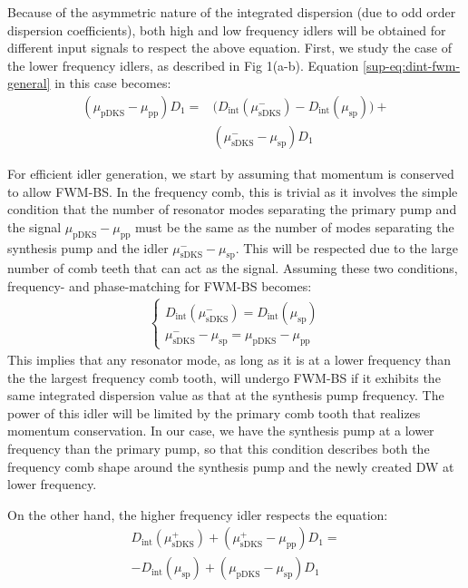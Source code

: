 \documentclass[reprint,superscriptaddress, amsmath,amssymb,pra, aps,floatfix,longbibliography]{revtex4-1}
\begin{document}
Because of the asymmetric nature of the integrated dispersion (due to odd order dispersion coefficients), both high and low frequency idlers will be obtained for different input signals to respect the above equation. First, we study the case of the lower frequency idlers, as described in Fig 1(a-b). Equation \ref{sup-eq:dint-fwm-general} in this case becomes:
\begin{align}
    \label{sup-eq:dint-fwm-minus}
    \left(\mu_\mathrm{pDKS} - \mu_\mathrm{pp} \right )D_1 = & \Big(D_\mathrm{int}(\mu_\mathrm{sDKS}^{-}) - D_\mathrm{int}(\mu_\mathrm{sp}) \Big) + \nonumber \\ &\left( \mu_\mathrm{sDKS}^{-} - \mu_\mathrm{sp} \right )D_1
\end{align}

For efficient idler generation, we start by assuming that momentum is conserved to allow FWM-BS. In the frequency comb, this is trivial as it involves the simple condition that the number of resonator modes separating the primary pump and the signal $\mu_\mathrm{pDKS} - \mu_\mathrm{pp}$ must be the same as the number of modes separating the synthesis pump and the idler $\mu_\mathrm{sDKS}^{-} - \mu_\mathrm{sp}$. This will be respected due to the large number of comb teeth that can act as the signal. Assuming these two conditions, frequency- and phase-matching for FWM-BS becomes:
\begin{align}
    \label{sup-eq:dint-minus-condition}
    \begin{cases}
        D_\mathrm{int}(\mu_\mathrm{sDKS}^{-}) =  D_\mathrm{int}(\mu_\mathrm{sp}) \\
        \mu_\mathrm{sDKS}^{-} - \mu_\mathrm{sp} = \mu_\mathrm{pDKS} - \mu_\mathrm{pp}
    \end{cases}
\end{align}
This implies that any resonator mode, as long as it is at a lower frequency than the the largest frequency comb tooth, will undergo FWM-BS if it exhibits the same integrated dispersion value as that at the synthesis pump frequency. The power of this idler will be limited by the primary comb tooth that realizes momentum conservation. In our case, we have the synthesis pump at a lower frequency than the primary pump, so that this condition describes both the frequency comb shape around the synthesis pump and the newly created DW at lower frequency.


On the other hand, the higher frequency idler respects the equation:
\begin{align}
    \label{sup-eq:dint-fwm-plus}
     D_\mathrm{int}(\mu_\mathrm{sDKS}^{+}) + \left(\mu_\mathrm{sDKS}^{+} - \mu_\mathrm{pp} \right)D_1 = \nonumber \\ - D_\mathrm{int}(\mu_\mathrm{sp}) + \left(\mu_\mathrm{pDKS} - \mu_\mathrm{sp}  \right)D_1
\end{align}
\end{document}
